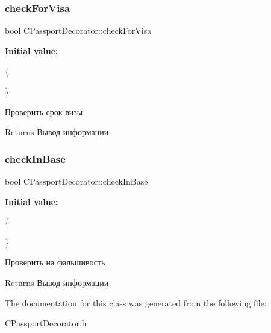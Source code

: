 \subsubsection{\texorpdfstring{check\+For\+Visa}{checkForVisa}}
{\footnotesize\ttfamily bool C\+Passport\+Decorator\+::check\+For\+Visa}

{\bfseries Initial value\+:}
\begin{DoxyCode}
\{
            
    \}
\end{DoxyCode}


Проверить срок визы 

\begin{DoxyReturn}{Returns}
Вывод информации 
\end{DoxyReturn}
\mbox{\label{classCPassportDecorator_a972d9fe88105ba06ec5bab01e230b1a8}} 
\subsubsection{\texorpdfstring{check\+In\+Base}{checkInBase}}
{\footnotesize\ttfamily bool C\+Passport\+Decorator\+::check\+In\+Base}

{\bfseries Initial value\+:}
\begin{DoxyCode}
\{
          
    \}
\end{DoxyCode}


Проверить на фальшивость 

\begin{DoxyReturn}{Returns}
Вывод информации 
\end{DoxyReturn}


The documentation for this class was generated from the following file\+:\begin{DoxyCompactItemize}
\item 
C\+Passport\+Decorator.\+h\end{DoxyCompactItemize}
